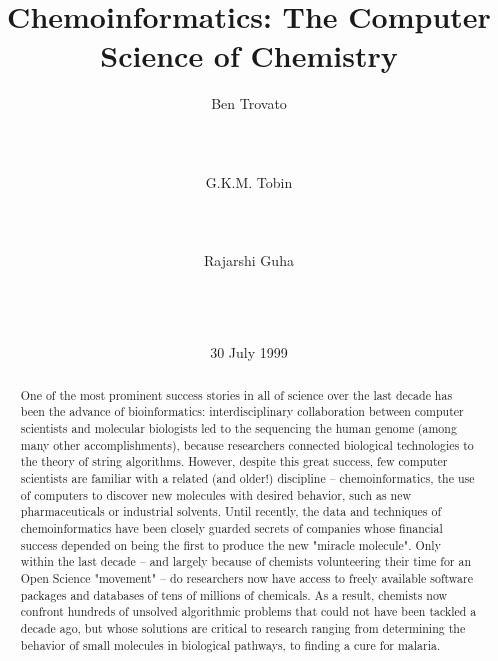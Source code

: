 \documentclass{sig-alternate}
\begin{document}
\title{Chemoinformatics: The Computer Science of Chemistry}
\author{
\alignauthor
Ben Trovato\\
       \\
       \\
       \\
\alignauthor
G.K.M. Tobin\\
       \\
       \\
       \\
\alignauthor
Rajarshi Guha\\
\\
\\
\\
}

\date{30 July 1999}

\maketitle
\begin{abstract}
  One of the most prominent success stories in all of science over the last decade has
  been the advance of bioinformatics: interdisciplinary collaboration between
  computer scientists and molecular biologists led to the sequencing the human genome
  (among many other accomplishments), because researchers connected biological
  technologies to the theory of string algorithms. However, despite this great
  success, few computer scientists are familiar with a related (and older!)
  discipline -- chemoinformatics, the use of computers to discover new molecules with
  desired behavior, such as new pharmaceuticals or industrial solvents. Until
  recently, the data and techniques of chemoinformatics have been closely guarded
  secrets of companies whose financial success depended on being the first to produce
  the new "miracle molecule". Only within the last decade -- and largely because of
  chemists volunteering their time for an Open Science "movement" -- do researchers
  now have access to freely available software packages and databases of tens of
  millions of chemicals. As a result, chemists now confront hundreds of unsolved
  algorithmic problems that could not have been tackled a decade ago, but whose
  solutions are critical to research ranging from determining the behavior of small
  molecules in biological pathways, to finding a cure for malaria.
\end{abstract}
\end{document}
